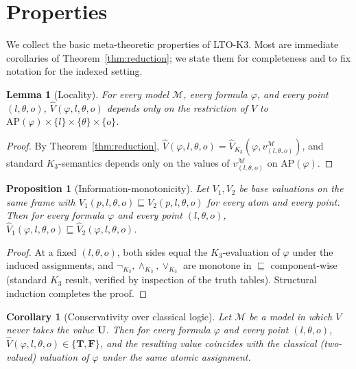 \documentclass[11pt,a4paper]{article}
\theoremstyle{definition}
\theoremstyle{plain}
\newtheorem{lemma}[definition]{Lemma}
\newtheorem{proposition}[definition]{Proposition}
\newtheorem{corollary}[definition]{Corollary}
\theoremstyle{remark}
\newcommand{\Tv}{\mathbf{T}}
\newcommand{\Fv}{\mathbf{F}}
\newcommand{\Uv}{\mathbf{U}}
\newcommand{\Vh}{\widehat{V}}
\newcommand{\frm}{(l, \theta, o)}
\newcommand{\AP}{\mathrm{AP}}
\newcommand{\Mod}{\mathcal{M}}
\begin{document}
\section{Properties}
\label{sec:properties}

We collect the basic meta-theoretic properties of LTO-K3. Most are
immediate corollaries of Theorem~\ref{thm:reduction}; we state them for
completeness and to fix notation for the indexed setting.

\begin{lemma}[Locality]\label{lem:locality}
For every model $\Mod$, every formula $\varphi$, and every point $\frm$,
$\Vh(\varphi, l, \theta, o)$ depends only on the restriction of $V$ to
$\AP(\varphi) \times \{l\} \times \{\theta\} \times \{o\}$.
\end{lemma}

\begin{proof}
By Theorem~\ref{thm:reduction}, $\Vh(\varphi, l, \theta, o) =
\Vh_{K_3}(\varphi, v_{\frm}^{\Mod})$, and standard $K_3$-semantics
depends only on the values of $v_{\frm}^{\Mod}$ on $\AP(\varphi)$.
\end{proof}

\begin{proposition}[Information-monotonicity]\label{prop:mono}
Let $V_1, V_2$ be base valuations on the same frame with
$V_1(p, l, \theta, o) \sqsubseteq V_2(p, l, \theta, o)$ for every atom
and every point. Then for every formula $\varphi$ and every point $\frm$,
$\Vh_1(\varphi, l, \theta, o) \sqsubseteq \Vh_2(\varphi, l, \theta, o)$.
\end{proposition}

\begin{proof}
At a fixed $\frm$, both sides equal the $K_3$-evaluation of $\varphi$
under the induced assignments, and $\lnot_{K_3}, \land_{K_3}, \lor_{K_3}$
are monotone in $\sqsubseteq$ component-wise (standard $K_3$ result,
verified by inspection of the truth tables). Structural induction
completes the proof.
\end{proof}

\begin{corollary}[Conservativity over classical logic]\label{cor:cons}
Let $\Mod$ be a model in which $V$ never takes the value $\Uv$. Then for
every formula $\varphi$ and every point $\frm$,
$\Vh(\varphi, l, \theta, o) \in \{\Tv, \Fv\}$, and the resulting value
coincides with the classical (two-valued) valuation of $\varphi$ under
the same atomic assignment.
\end{corollary}
\end{document}
